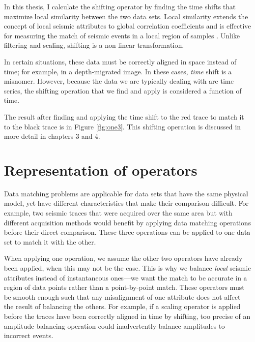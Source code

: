 In this thesis, I calculate the shifting operator by finding the time shifts that maximize local similarity between the two data sets.
Local similarity extends the concept of local seismic attributes to global correlation coefficients and is effective for measuring the match of seismic events in a local region of samples \cite[]{attr}.
Unlike filtering and scaling, shifting is a non-linear transformation.

In certain situations, these data must be correctly aligned in space instead of time; for example, in a depth-migrated image.
In these cases, {\em time} shift is a misnomer. 
However, because the data we are typically dealing with are time series, the shifting operation that we find and apply is considered a function of time.

The result after finding and applying the time shift to the red trace to match it to the black trace is in Figure \ref{fig:one3}.
This shifting operation is discussed in more detail in chapters 3 and 4.


\section{Representation of operators}
Data matching problems are applicable for data sets that have the same physical model, yet have different characteristics that make their comparison difficult.
For example, two seismic traces that were acquired over the same area but with different acquisition methods would benefit by applying data matching operations before their direct comparison. 
These three operations can be applied to one data set to match it with the other.

When applying one operation, we assume the other two operators have already been applied, when this may not be the case.
This is why we balance {\em local} seismic attributes instead of instantaneous ones---we want the match to be accurate in a region of data points rather than a point-by-point match.
These operators must be smooth enough such that any misalignment of one attribute does not affect the result of balancing the others.
For example, if a scaling operator is applied before the traces have been correctly aligned in time by shifting, 
too precise of an amplitude balancing operation could inadvertently balance amplitudes to incorrect events.


